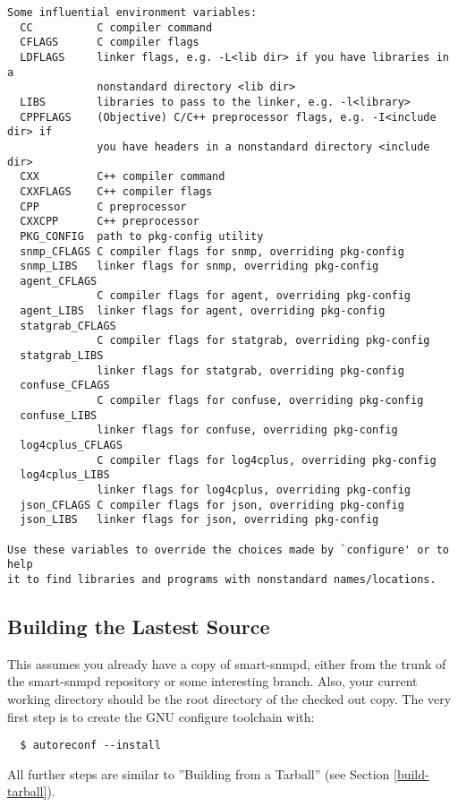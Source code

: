 \begin{verbatim}
Some influential environment variables:
  CC          C compiler command
  CFLAGS      C compiler flags
  LDFLAGS     linker flags, e.g. -L<lib dir> if you have libraries in a
              nonstandard directory <lib dir>
  LIBS        libraries to pass to the linker, e.g. -l<library>
  CPPFLAGS    (Objective) C/C++ preprocessor flags, e.g. -I<include dir> if
              you have headers in a nonstandard directory <include dir>
  CXX         C++ compiler command
  CXXFLAGS    C++ compiler flags
  CPP         C preprocessor
  CXXCPP      C++ preprocessor
  PKG_CONFIG  path to pkg-config utility
  snmp_CFLAGS C compiler flags for snmp, overriding pkg-config
  snmp_LIBS   linker flags for snmp, overriding pkg-config
  agent_CFLAGS
              C compiler flags for agent, overriding pkg-config
  agent_LIBS  linker flags for agent, overriding pkg-config
  statgrab_CFLAGS
              C compiler flags for statgrab, overriding pkg-config
  statgrab_LIBS
              linker flags for statgrab, overriding pkg-config
  confuse_CFLAGS
              C compiler flags for confuse, overriding pkg-config
  confuse_LIBS
              linker flags for confuse, overriding pkg-config
  log4cplus_CFLAGS
              C compiler flags for log4cplus, overriding pkg-config
  log4cplus_LIBS
              linker flags for log4cplus, overriding pkg-config
  json_CFLAGS C compiler flags for json, overriding pkg-config
  json_LIBS   linker flags for json, overriding pkg-config

Use these variables to override the choices made by `configure' or to help
it to find libraries and programs with nonstandard names/locations.
\end{verbatim}

\subsection{Building the Lastest Source}

This assumes you already have a copy of smart-snmpd, either from the trunk
of the smart-snmpd repository or some interesting branch. Also, your
current working directory should be the root directory of the checked out copy.
The very first step is to create the GNU configure toolchain with:

\begin{verbatim}
  $ autoreconf --install
\end{verbatim}

All further steps are similar to ''Building from a Tarball'' (see
Section \ref{build-tarball}).

